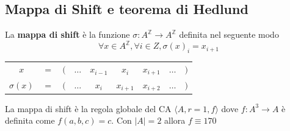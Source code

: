 \subsection{ Mappa di Shift e teorema di Hedlund}
\begin{definizione} 
    La \textbf{mappa di shift} è la funzione $\sigma:A^\mathbb{Z}\rightarrow A^\mathbb{Z}$
    definita nel seguente modo
    $$\forall x\in A^\mathbb{Z}, \forall i \in Z, \sigma(x)_i=x_{i+1}$$
    \begin{table}[!h]
        \centering
        \begin{tabular}{ccccccccc}
            $x$         & $=$ & $($ & $\dots$ & $x_{i-1}$ & $x_i$     & $x_{i+1}$ & $\dots$ & $)$ \\
            $\sigma(x)$ & $=$ & $($ & $\dots$ & $x_{i}$   & $x_{i+1}$ & $x_{i+2}$ & $\dots$ & $)$
        \end{tabular}
    \end{table}
\end{definizione}

\begin{nota}
    La mappa di shift è la regola globale del CA $\langle A,r=1,f\rangle$ dove
    $f:A^3\rightarrow A$ è definita come $f(a,b,c) = c$. Con $|A|=2$ allora $f\equiv 170$

\end{nota}

